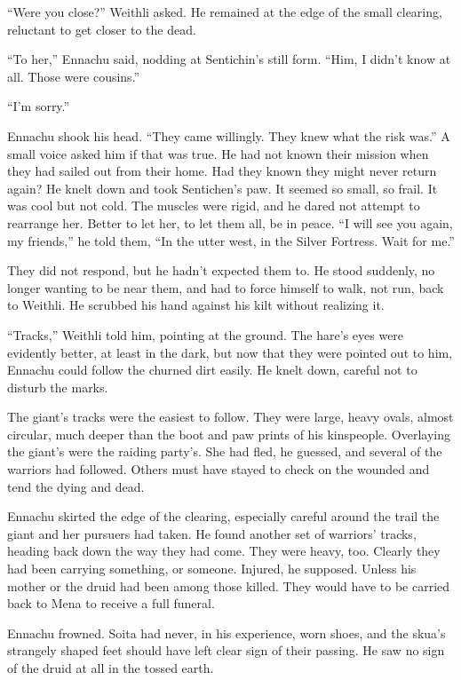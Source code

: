 ``Were you close?'' Weithli asked. He remained at the edge of the small clearing, reluctant to get closer to the dead.

``To her,'' Ennachu said, nodding at Sentichin's still form. ``Him, I didn't know at all. Those were cousins.''

``I'm sorry.''

Ennachu shook his head. ``They came willingly. They knew what the risk was.'' A small voice asked him if that was true. He had not known their mission when they had sailed out from their home. Had they known they might never return again? He knelt down and took Sentichen's paw. It seemed so small, so frail. It was cool but not cold. The muscles were rigid, and he dared not attempt to rearrange her. Better to let her, to let them all, be in peace. ``I will see you again, my friends,'' he told them, ``In the utter west, in the Silver Fortress. Wait for me.''

They did not respond, but he hadn't expected them to. He stood suddenly, no longer wanting to be near them, and had to force himself to walk, not run, back to Weithli. He scrubbed his hand against his kilt without realizing it.

``Tracks,'' Weithli told him, pointing at the ground. The hare's eyes were evidently better, at least in the dark, but now that they were pointed out to him, Ennachu could follow the churned dirt easily. He knelt down, careful not to disturb the marks.

The giant's tracks were the easiest to follow. They were large, heavy ovals, almost circular, much deeper than the boot and paw prints of his kinspeople. Overlaying the giant's were the raiding party's. She had fled, he guessed, and several of the warriors had followed. Others must have stayed to check on the wounded and tend the dying and dead.

Ennachu skirted the edge of the clearing, especially careful around the trail the giant and her pursuers had taken. He found another set of warriors' tracks, heading back down the way they had come. They were heavy, too. Clearly they had been carrying something, or someone. Injured, he supposed. Unless his mother or the druid had been among those killed. They would have to be carried back to Mena to receive a full funeral.

Ennachu frowned. Soita had never, in his experience, worn shoes, and the skua's strangely shaped feet should have left clear sign of their passing. He saw no sign of the druid at all in the tossed earth.

